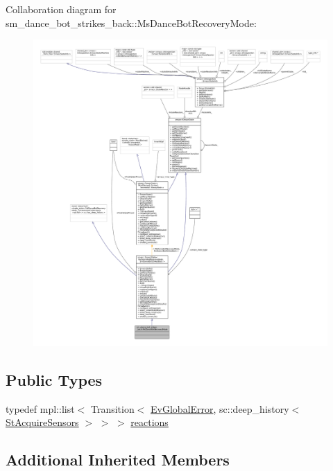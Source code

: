 Collaboration diagram for sm\+\_\+dance\+\_\+bot\+\_\+strikes\+\_\+back\+:\+:Ms\+Dance\+Bot\+Recovery\+Mode\+:
\nopagebreak
\begin{figure}[H]
\begin{center}
\leavevmode
\includegraphics[width=350pt]{classsm__dance__bot__strikes__back_1_1MsDanceBotRecoveryMode__coll__graph}
\end{center}
\end{figure}
\subsection*{Public Types}
\begin{DoxyCompactItemize}
\item 
typedef mpl\+::list$<$ Transition$<$ \hyperlink{structsm__dance__bot__strikes__back_1_1EvGlobalError}{Ev\+Global\+Error}, sc\+::deep\+\_\+history$<$ \hyperlink{structsm__dance__bot__strikes__back_1_1StAcquireSensors}{St\+Acquire\+Sensors} $>$ $>$ $>$ \hyperlink{classsm__dance__bot__strikes__back_1_1MsDanceBotRecoveryMode_a4eb40cad98fb332413ed8c515b9c0cf2}{reactions}
\end{DoxyCompactItemize}
\subsection*{Additional Inherited Members}


